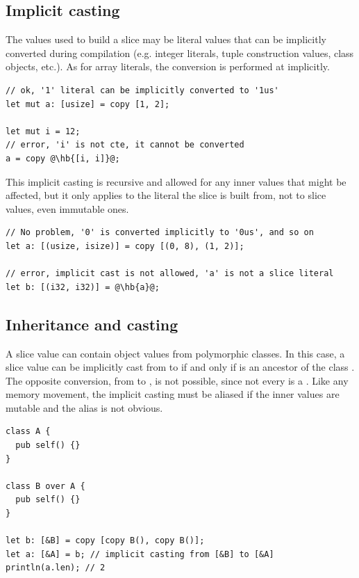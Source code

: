 \subsection{Implicit casting}

The values used to build a slice may be literal values that can be implicitly
converted during compilation (e.g. integer literals, tuple construction values,
class objects, etc.). As for array literals, the conversion is performed at
 implicitly.

\begin{lstlisting}[style=coloredverbatimError, escapechar=@]
// ok, '1' literal can be implicitly converted to '1us'
let mut a: [usize] = copy [1, 2];

let mut i = 12;
// error, 'i' is not cte, it cannot be converted
a = copy @\hb{[i, i]}@;
\end{lstlisting}

This implicit casting is recursive and allowed for any inner values that might
be affected, but it only applies to the literal the slice is built from, not to
slice values, even immutable ones.

\begin{lstlisting}[style=coloredverbatimError, escapechar=@]
// No problem, '0' is converted implicitly to '0us', and so on
let a: [(usize, isize)] = copy [(0, 8), (1, 2)];

// error, implicit cast is not allowed, 'a' is not a slice literal
let b: [(i32, i32)] = @\hb{a}@;
\end{lstlisting}

\subsection{Inheritance and casting}

A slice value can contain object values from polymorphic classes. In this case,
a slice value can be implicitly cast from \token{[B]} to \token{[A]} if and only
if  is an ancestor of the class . The opposite conversion,
from \token{[A]} to \token{[B]}, is not possible, since not every  is a
. Like any memory movement, the implicit casting must be aliased if the
inner values are mutable and the alias is not obvious.

\begin{lstlisting}[style=coloredverbatim]
class A {
  pub self() {}
}

class B over A {
  pub self() {}
}

let b: [&B] = copy [copy B(), copy B()];
let a: [&A] = b; // implicit casting from [&B] to [&A]
println(a.len); // 2
\end{lstlisting}

\vfill%
\pagebreak
